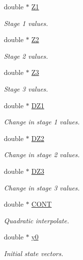 \begin{DoxyCompactItemize}
double $\ast$ \hyperlink{structradau2acu_1_1solver__memory_a3920a2e20d5145ffe2b1ecdca5c7fa22}{Z1}
\begin{DoxyCompactList}\small\item\em Stage 1 values. \end{DoxyCompactList}\item 
double $\ast$ \hyperlink{structradau2acu_1_1solver__memory_a01e0b1a2d05bcd51d00cb1418a790d79}{Z2}
\begin{DoxyCompactList}\small\item\em Stage 2 values. \end{DoxyCompactList}\item 
double $\ast$ \hyperlink{structradau2acu_1_1solver__memory_ac4d01cd67d75acfe199be4d4676c0bf7}{Z3}
\begin{DoxyCompactList}\small\item\em Stage 3 values. \end{DoxyCompactList}\item 
double $\ast$ \hyperlink{structradau2acu_1_1solver__memory_a78015c06e296e68bcf33d8a0d426274b}{D\+Z1}
\begin{DoxyCompactList}\small\item\em Change in stage 1 values. \end{DoxyCompactList}\item 
double $\ast$ \hyperlink{structradau2acu_1_1solver__memory_a61abfb203c0d4cdc85f74f380228ad8a}{D\+Z2}
\begin{DoxyCompactList}\small\item\em Change in stage 2 values. \end{DoxyCompactList}\item 
double $\ast$ \hyperlink{structradau2acu_1_1solver__memory_a6295db592933b6a3260b8aa11f1720d3}{D\+Z3}
\begin{DoxyCompactList}\small\item\em Change in stage 3 values. \end{DoxyCompactList}\item 
double $\ast$ \hyperlink{structradau2acu_1_1solver__memory_a6b70e663fca70c209479ba26b89518d9}{C\+O\+NT}
\begin{DoxyCompactList}\small\item\em Quadratic interpolate. \end{DoxyCompactList}\item 
double $\ast$ \hyperlink{structradau2acu_1_1solver__memory_a61b9966a8ea1d5526161988837795e7a}{y0}
\begin{DoxyCompactList}\small\item\em Initial state vectors. \end{DoxyCompactList}\item 

\end{DoxyCompactItemize}
